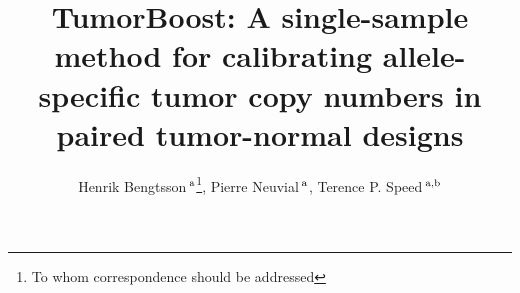 \documentclass[]{bioinfo}
\begin{document}

\title[TumorBoost]{TumorBoost: A single-sample method for calibrating allele-specific tumor copy numbers in paired tumor-normal designs}
\author[Bengtsson et al.]{Henrik Bengtsson\,$^{\rm a}$\footnote{To whom correspondence should be addressed}, Pierre Neuvial\,$^{\rm a}$, Terence P. Speed\,$^{\rm a,b}$}
\address{
  $^{\rm a}$ Department of Statistics, University of California, Berkeley, USA.
  $^{\rm b}$ Bioinformatics Division, Walter \& Eliza Hall Institute of Medical Research, Parkville, Australia.
} 



\maketitle
\end{document}
